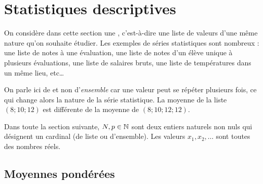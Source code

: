 
\chapter{Statistiques descriptives}
\label{chap:statistiques}


On considère dans cette section une , c'est-à-dire une liste de valeurs d'une même nature qu'on souhaite étudier.
Les exemples de séries statistiques sont nombreux : une liste de notes à une évaluation, une liste de notes d'un élève unique à plusieurs évaluations, une liste de salaires bruts, une liste de températures dans un même lieu, etc…

On parle ici de  et non d'\emph{ensemble} car une valeur peut se répéter plusieurs fois, ce qui change alors la nature de la série statistique.
La moyenne de la liste $(8; 10; 12)$ est différente de la moyenne de $(8; 10; 12; 12)$.

Dans toute la section suivante, $N, p \in \mathbb{N}$ sont deux entiers naturels non nuls qui désignent un cardinal (de liste ou d'ensemble). 
Les valeurs $x_1, x_2, \dots$ sont toutes des nombres réels.


\section{Moyennes pondérées}





